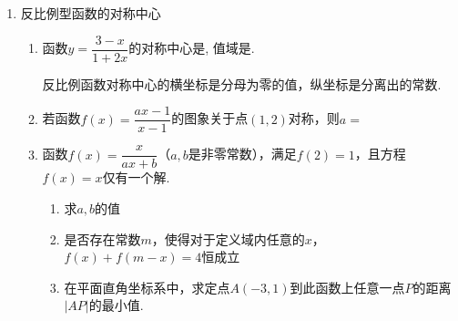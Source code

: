\begin{enumerate}
\item 反比例型函数的对称中心
\begin{enumerate}
    \item 函数$y=\dfrac{3-x}{1+2x}$的对称中心是, 值域是. 
    \begin{jieda}
        反比例函数对称中心的横坐标是分母为零的值，纵坐标是分离出的常数.
    \end{jieda}
    \item 若函数$f(x) = \dfrac{ax-1}{x-1}$的图象关于点$(1, 2)$对称，则$a = $
    \item 函数$f(x) = \dfrac{x}{ax+b}$（$a, b$是非零常数），满足$f(2) = 1$，且方程$f(x) = x$仅有一个解.
    \begin{enumerate}
        \item 求$a, b$的值
        \item 是否存在常数$m$，使得对于定义域内任意的$x$，$f(x) + f(m-x) = 4$恒成立
        \item 在平面直角坐标系中，求定点$A(-3, 1)$到此函数上任意一点$P$的距离$|AP|$的最小值.
    \end{enumerate}
    \begin{jieda}
\end{jieda}
\end{enumerate}
\end{enumerate}
